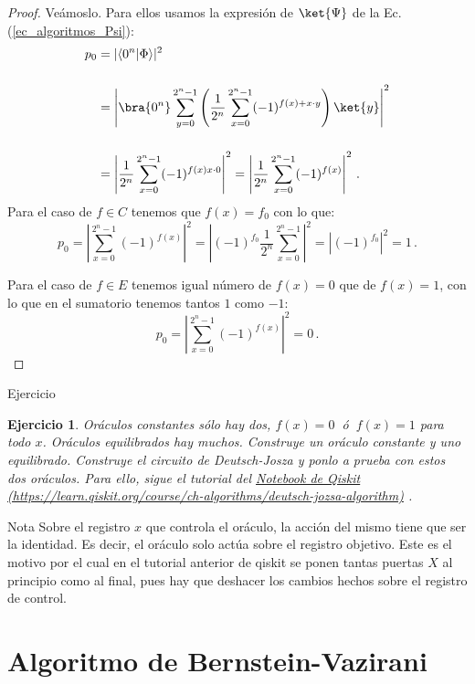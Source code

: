\documentclass[a4paper,11pt]{book} %
\newtheorem{ejercicio_contador}{Ejercicio}
\newcommand{\Ejercicio}[1]{
		\begin{mybox_gray}{Ejercicio} 
			\begin{ejercicio_contador}
				 #1 
			\end{ejercicio_contador} 
		\end{mybox_gray}
	}
\numberwithin{equation}{chapter}
\newcommand{\braket}[2]{\langle #1|#2\rangle}
\begin{document}
	\begin{proof}
	Veámoslo. Para ellos usamos la expresión de $\ket{\Psi}$ de la Ec. (\ref{ec_algoritmos_Psi}):
	\begin{align*}
	p_{0} &= |\braket{0^n}{\Phi}|^2 \nonumber\\ \rule{0mm}{12mm}
		  &= \left| \bra{0^n} \sum_{y=0}^{2^n-1} \left( \frac{1}{2^n}\sum_{x=0}^{2^n-1}(-1)^{f(x) + x \cdot y} \right)\ket{y} \right|^2 \\ \rule{0mm}{12mm}
	      &= \left| \frac{1}{2^n} \sum_{x=0}^{2^n-1} (-1)^{f(x) x \cdot 0} \right|^2   =  \left| \frac{1}{2^n} \sum_{x=0}^{2^n-1} (-1)^{f(x)} \right|^2 \, .
	\end{align*}
	Para el caso de $f \in C$ tenemos que $f(x) = f_0$ con lo que:
	\begin{equation*}
	p_{0} = \left|  \sum_{x=0}^{2^n-1} (-1)^{f(x)} \right|^2    =  \left| (-1)^{f_0} \frac{1}{2^n} \sum_{x=0}^{2^n-1}  \right|^2  = \left| (-1)^{f_0} \right|^2 = 1  \, .
	\end{equation*}
	
	Para el caso de $f \in E$ tenemos igual número de  $f(x) = 0$ que de $f(x) = 1$, con lo que en el sumatorio tenemos tantos $1$ como $-1$:
	\begin{equation*}
	p_{0} = \left|  \sum_{x=0}^{2^n-1} (-1)^{f(x)} \right|^2    =  0  \, .
	\end{equation*}
	\end{proof}



	\Ejercicio{
	Oráculos constantes sólo hay dos, $f(x)=0~$ ó $~f(x) = 1$ para todo $x$. Oráculos equilibrados hay muchos. Construye un oráculo constante y uno
	equilibrado. Construye el circuito de Deutsch-Josza y ponlo a prueba con estos dos oráculos. Para ello, sigue el tutorial del 
	\href{https://learn.qiskit.org/course/ch-algorithms/deutsch-jozsa-algorithm}{Notebook de Qiskit (https://learn.qiskit.org/course/ch-algorithms/deutsch-jozsa-algorithm)} . 
	}

	\begin{mybox_blue}{Nota}
	Sobre el registro $x$ que controla el oráculo, la acción del mismo tiene que ser la identidad. Es decir, el oráculo solo actúa sobre el registro objetivo. Este es el motivo por el cual en el 
	tutorial anterior de qiskit se ponen tantas puertas $X$ al principio como al final, pues hay que deshacer los cambios hechos sobre el registro de control.
	\end{mybox_blue}

	\section{Algoritmo de Bernstein-Vazirani}
		
\end{document}
